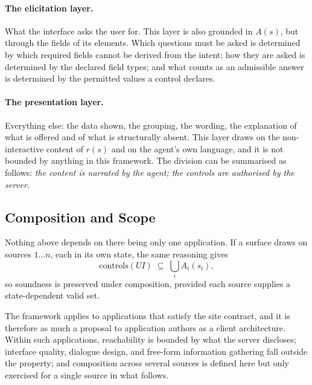 \paragraph{The elicitation layer.} What the interface asks the user for. This layer is also grounded in $A(s)$, but through the fields of its elements. Which questions must be asked is determined by which required fields cannot be derived from the intent; how they are asked is determined by the declared field types; and what counts as an admissible answer is determined by the permitted values a control declares.

\paragraph{The presentation layer.} Everything else: the data shown, the grouping, the wording, the explanation of what is offered and of what is structurally absent. This layer draws on the non-interactive content of $r(s)$ and on the agent's own language, and it is not bounded by anything in this framework. The division can be summarised as follows: \emph{the content is narrated by the agent; the controls are authorised by the server.}



\subsection{Composition and Scope}\label{sec:design:composition}

Nothing above depends on there being only one application. If a surface draws on sources $1 \dots n$, each in its own state, the same reasoning gives
\[ \mathrm{controls}(UI) \;\subseteq\; \bigcup_{i} A_i(s_i),
\] so soundness is preserved under composition, provided each source supplies a state-dependent valid set.


The framework applies to applications that satisfy the site contract, and it is therefore as much a proposal to application authors as a client architecture. Within such applications, reachability is bounded by what the server discloses; interface quality, dialogue design, and free-form information gathering fall outside the property; and composition across several sources is defined here but only exercised for a single source in what follows.
